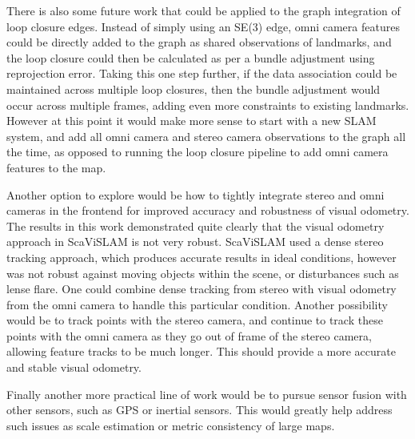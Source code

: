 There is also some future work that could be applied to the graph integration of loop closure edges.  Instead of simply using an SE(3) edge, omni camera features could be directly added to the graph as shared observations of landmarks, and the loop closure could then be calculated as per a bundle adjustment using reprojection error.  Taking this one step further, if the data association could be maintained across multiple loop closures, then the bundle adjustment would occur across multiple frames, adding even more constraints to existing landmarks.  However at this point it would make more sense to start with a new SLAM system, and add all omni camera and stereo camera observations to the graph all the time, as opposed to running the loop closure pipeline to add omni camera features to the map.

Another option to explore would be how to tightly integrate stereo and omni cameras in the frontend for improved accuracy and robustness of visual odometry.  The results in this work demonstrated quite clearly that the visual odometry approach in ScaViSLAM is not very robust.  ScaViSLAM used a dense stereo tracking approach, which produces accurate results in ideal conditions, however was not robust against moving objects within the scene, or disturbances such as lense flare.  One could combine dense tracking from stereo with visual odometry from the omni camera to handle this particular condition.  Another possibility would be to track points with the stereo camera, and continue to track these points with the omni camera as they go out of frame of the stereo camera, allowing feature tracks to be much longer.  This should provide a more accurate and stable visual odometry.

Finally another more practical line of work would be to pursue sensor fusion with other sensors, such as GPS or inertial sensors.  This would greatly help address such issues as scale estimation or metric consistency of large maps.


